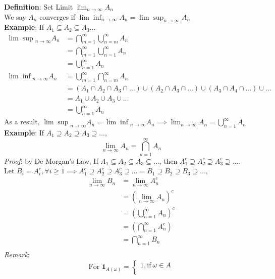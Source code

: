 \documentclass[11pt]{article}
\begin{document}
\begin{enumerate}
\textbf{Definition}: Set Limit $\lim _{n \rightarrow \infty} A_n$\\
We say $A_n$ converges if $\lim \inf _{n \rightarrow \infty} A_n = \lim \sup _{n \rightarrow \infty} A_n$\\
\textbf{Example}: If $A_1 \subseteq A_2 \subseteq A_3 ...$\\
\begin{align*}
{\lim \sup}_{n \rightarrow \infty} A_n &= \bigcap_{m=1}^{\infty} \bigcup_{n=m}^{\infty} A_n\\
&= \bigcap_{m=1}^{\infty} \bigcup_{n=1}^{\infty} A_n\\
&= \bigcup_{n=1}^{\infty} A_n\\
{\lim \inf}_{n \rightarrow \infty} A_n &= \bigcup_{m=1}^{\infty} \bigcap_{n=m}^{\infty} A_n \\
&= (A_1 \cap A_2 \cap A_3 \cap ...) \cup (A_2 \cap A_3 \cap ...) \cup (A_3 \cap A_4 \cap ...) \cup ...\\
&= A_1 \cup A_2 \cup A_3 \cup ...\\
&= \bigcup_{n=1}^{\infty} A_n
\end{align*}
As a result, ${\lim \sup}_{n \rightarrow \infty} A_n = {\lim \inf}_{n \rightarrow \infty} A_n \implies \lim _{n \rightarrow \infty} A_n = \bigcup_{n=1}^{\infty} A_n$\\
\textbf{Example}: If $A_1 \supseteq A_2 \supseteq A_3 \supseteq ...$,\\
$$\lim _{n \rightarrow \infty} A_n = \bigcap_{n=1}^{\infty} A_n$$
\textit{Proof}: by De Morgan's Law,
If $A_1 \subseteq A_2 \subseteq A_3 \subseteq ...$, then $A_1 ^c \supseteq A_2 ^c \supseteq A_3 ^c \supseteq ...$.\\
Let $B_i = A_i ^c,  \forall i \geq 1 \implies A_1 ^c \supseteq A_2 ^c \supseteq A_3 ^c \supseteq ... = B_1 \supseteq B_2 \supseteq B_3 \supseteq ...$,
\begin{align*}
\lim_{n \rightarrow \infty} B_n &= \lim_{n \rightarrow \infty} A_n ^c\\
&= (\lim_{n \rightarrow \infty} A_n )^c\\
&= (\bigcup_{n=1}^{\infty} A_n)^c\\
&= (\bigcap_{n=1}^{\infty} A_n ^c)\\
&= \bigcap_{n=1}^{\infty} B_n\\
\end{align*}
\textit{Remark}: \begin{equation}
\text{For } \textbf{1}_{A(\omega)} =  \begin{cases}
1, \text{if}\ \omega \in A\\

\end{cases}
\end{equation}
\end{enumerate}
\end{document}
